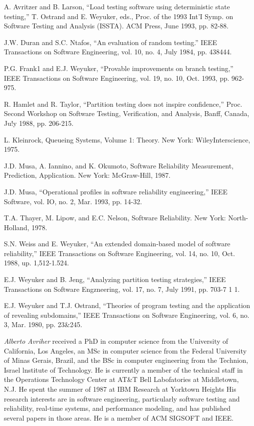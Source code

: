 \documentclass[journal, twoside]{IEEEtran}
\begin{document}
\begin{thebibliography}{}
A. Avritzer and B. Larson, “Load testing software using deterministic
state testing,” T. Ostrand and E. Weyuker, eds., Proc. of the 1993 Int’I
Symp. on Software Testing and Analysis (ISSTA). ACM Press, June 1993, pp. 82-88.

J.W. Duran and S.C. Ntafos, “An evaluation of random testing.” IEEE
Transactions on Software Engineering, vol. 10, no. 4, July 1984, pp.
438444. 

P.G. Frank1 and E.J. Weyuker, “Provable improvements on branch
testing,” IEEE Transactions on Software Engineering, vol. 19, no. 10, Oct. 1993, pp. 962-975. 

R. Hamlet and R. Taylor, “Partition testing does not inspire confidence,” Proc. Second Workshop on Software Testing, Verification, and
Analysis, Banff, Canada, Ju!y 1988, pp. 206-215. 

L. Kleinrock, Queueing Systems, Volume 1: Theory. New York: WileyInterscience, 1975. 

J.D. Musa, A. Iannino, and K. Okumoto, Software Reliability Measurement, Prediction, Application. New York: McGraw-Hill, 1987. 

J.D. Musa, “Operational profiles in software reliability engineering,”
IEEE Software, vol. IO, no. 2, Mar. 1993, pp. 14-32. 

T.A. Thayer, M. Lipow, and E.C. Nelson, Software Reliability. New
York: North-Holland, 1978. 

S.N. Weiss and E. Weyuker, “An extended domain-based model of
software reliability,” IEEE Transactions on Software Engineering, vol.
14, no. 10, Oct. 1988, up. 1,512-1.524. 

E.J. Weyuker and B. Jeng, “Analyzing partition testing strategies,”
IEEE Transactions on Software Engzneering, vol. 17, no. 7, July 1991, pp. 703-7 1 1. 

E.J. Weyuker and T.J. Ostrand, “Theories of program testing and the
application of revealing subdomains,” IEEE Transactions on Software
Engineering, vol. 6, no. 3, Mar. 1980, pp. 23&245. 



\end{thebibliography}



\textit{Alberto Avriher} received a PhD in computer science from the University of California, Los Angeles,
an MSc in computer science from the Federal University of Minas Gerais, Brazil, and the BSc in
computer engineering from the Technion, Israel
lnstitute of Technology. He is currently a member of
the technical staff in the Operations Technology
Center at AT&T Bell Labofatories at Middletown,
N.J. He spent the summer of 1987 at IBM Research
at Yorktown Heights His research interests are in
software engineering, particularly software testing
and reliability, real-time systems, and performance modeling, and has published several papers in those areas. He is a member of ACM SIGSOFT and
IEEE. 
\end{document}
